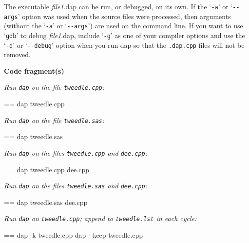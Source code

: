 \documentclass{book}
\makeatletter
\newcommand\Texinfocommandstyletextvar[1]{{\normalfont{}\textsl{#1}}}%
\newenvironment{Texinfopreformatted}{%
  \par\GNUTobeylines\obeyspaces\frenchspacing\parskip=\z@\parindent=\z@}{}
{\catcode`\^^M=13 \gdef\GNUTobeylines{\catcode`\^^M=13 \def^^M{\null\par}}}
\newenvironment{Texinfoindented}{\begin{list}{}{}\item\relax}{\end{list}}
\renewcommand{\_}{\Texinfounderscore\discretionary{}{}{}}
\makeatother
\begin{document}
The executable \Texinfocommandstyletextvar{file1}.dap can be run, or debugged,
%
on its own.
If the `\texttt{-a}' or `\texttt{{-}{-}args}'
%
%
option was used when the source files were processed, then arguments
%
(without the `\texttt{-a}' or `\texttt{{-}{-}args}') are used on the command line.
If you want to use `\texttt{gdb}'
to debug \Texinfocommandstyletextvar{file1}.dap, include `\texttt{-g}' as one
of your compiler options and use the `\texttt{-d}' or `\texttt{{-}{-}debug}' option when you run
dap so that the \texttt{.dap.cpp} files will not be removed.

\noindent{}\textbf{Code fragment(s)}

\emph{Run \texttt{dap} on the file \texttt{tweedle.cpp}:}
\begin{Texinfoindented}
\begin{Texinfopreformatted}%
\ttfamily dap tweedle.cpp
\end{Texinfopreformatted}
\end{Texinfoindented}

\emph{Run \texttt{dap} on the file \texttt{tweedle.sas}:}
\begin{Texinfoindented}
\begin{Texinfopreformatted}%
\ttfamily dap tweedle.sas
\end{Texinfopreformatted}
\end{Texinfoindented}

\emph{Run \texttt{dap} on the files \texttt{tweedle.cpp} and \texttt{dee.cpp}:}
\begin{Texinfoindented}
\begin{Texinfopreformatted}%
\ttfamily dap tweedle.cpp dee.cpp
\end{Texinfopreformatted}
\end{Texinfoindented}

\emph{Run \texttt{dap} on the files \texttt{tweedle.sas} and \texttt{dee.cpp}:}
\begin{Texinfoindented}
\begin{Texinfopreformatted}%
\ttfamily dap tweedle.sas dee.cpp
\end{Texinfopreformatted}
\end{Texinfoindented}

\emph{Run \texttt{dap} on \texttt{tweedle.cpp}; append to \texttt{tweedle.lst} in each cycle:}
\begin{Texinfoindented}
\begin{Texinfopreformatted}%
\ttfamily dap -k tweedle.cpp
dap {-}{-}keep tweedle.cpp
\end{Texinfopreformatted}
\end{Texinfoindented}
\end{document}
